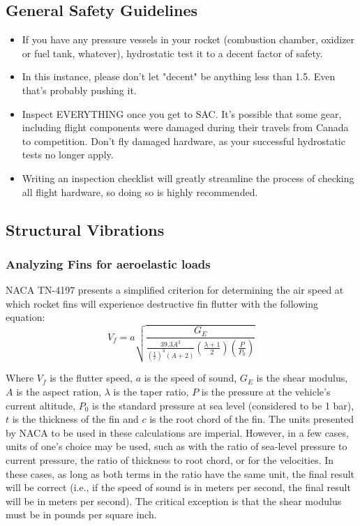 \subsection{General Safety Guidelines}
\begin{itemize}
\item If you have any pressure vessels in your rocket (combustion chamber, oxidizer or fuel tank, whatever), hydrostatic test it to a decent factor of safety.
\item In this instance, please don't let "decent" be anything less than 1.5. Even that's probably pushing it.
\item Inspect EVERYTHING once you get to SAC. It’s possible that some gear, including flight components were damaged during their travels from Canada to competition. Don’t fly damaged hardware, as your successful hydrostatic tests no longer apply.
\item Writing an inspection checklist will greatly streamline the process of checking all flight hardware, so doing so is highly recommended.
\end{itemize}

\subsection{Structural Vibrations}
\subsubsection{Analyzing Fins for aeroelastic loads}

NACA TN-4197 presents a simplified criterion for determining the air speed at which rocket fins will experience destructive fin flutter with the following equation:
\begin{equation}
V_f = a\sqrt{\frac{G_E}{\frac{39.3A^3}{(\frac{t}{c})^3(A+2)}(\frac{\lambda+1}{2})(\frac{P}{P_0})}}
\end{equation}

Where $V_f$ is the flutter speed, $a$ is the speed of sound, $G_E$ is the shear modulus, $A$ is the aspect ration, $\lambda$ is the taper ratio, $P$ is the pressure at the vehicle’s current altitude, $P_0$ is the standard pressure at sea level (considered to be 1 bar), $t$ is the thickness of the fin and $c$ is the root chord of the fin.
	The units presented by NACA to be used in these calculations are imperial. However, in a few cases, units of one’s choice may be used, such as with the ratio of sea-level pressure to current pressure, the ratio of thickness to root chord, or for the velocities. In these cases, as long as both terms in the ratio have the same unit, the final result will be correct (i.e., if the speed of sound is in meters per second, the final result will be in meters per second). The critical exception is that the shear modulus must be in pounds per square inch.
